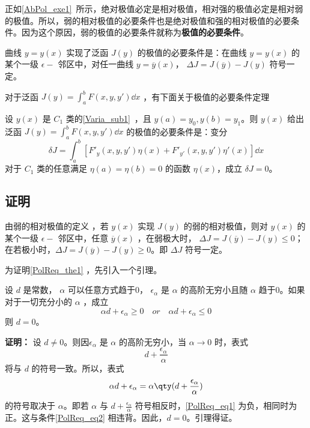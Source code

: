 

正如\autoref{AbPol_exe1}~所示，绝对极值必定是相对极值，相对强的极值必定是相对弱的极值。所以，弱的相对极值的必要条件也是绝对极值和强的相对极值的必要条件。因为这个原因，弱的极值的必要条件就称为\textbf{极值的必要条件}。

曲线 $y=y(x)$ 实现了泛函 $J(y)$ 的极值的必要条件是：在曲线 $y=y(x)$ 的某个一级 $\epsilon-$ 邻区中，对任一曲线 $y=\overline{y}(x)$， $\Delta J=J(\overline{y})-J(y)$ 符号一定。

对于泛函 $J(y)=\int_a^bF(x,y,y')\dd x$ ，有下面关于极值的必要条件定理
\begin{theorem}{}\label{PolReq_the1}
设 $y(x)$ 是 $C_1$ 类的\autoref{Varia_sub1}~，且 $y(a)=y_0,y(b)=y_1$。则 $y(x)$ 给出泛函 $J(y)=\int_a^bF(x,y,y')\dd x$ 的极值的必要条件是：变分
\begin{equation}
\delta J=\int_a^b[F'_y(x,y,y')\eta(x)+F'_{y'}(x,y,y')\eta'(x)]\dd x
\end{equation}
对于 $C_1$ 类的任意满足 $\eta(a)=\eta(b)=0$ 的函数 $\eta(x)$，成立 $\delta J=0$。
\end{theorem}
\subsection{证明}
由弱的相对极值的定义 ，若 $y(x)$ 实现 $J(y)$ 的弱的相对极值，则对 $y(x)$ 的某个一级 $\epsilon-$ 邻区中，任意 $\overline{y}(x)$ ，在弱极大时， $\Delta J=J(\overline{y})-J(y)\leq 0$；在若极小时，$\Delta J=J(\overline{y})-J(y)\geq 0$。即 $\Delta J$ 符号一定。

为证明\autoref{PolReq_the1} ，先引入一个引理。
\begin{lemma}{}\label{PolReq_lem1}
设 $d$ 是常数， $\alpha$ 可以任意方式趋于0， $\epsilon_\alpha$ 是 $\alpha$ 的高阶无穷小且随 $\alpha$ 趋于0。如果对于一切充分小的 $\alpha$ ，成立 
\begin{equation}\label{PolReq_eq2}
\alpha d+\epsilon_\alpha\geq0\quad or\quad\alpha d+\epsilon_\alpha\leq0
\end{equation}
则 $d=0$。
\end{lemma}
\textbf{证明：} 设 $d\neq 0$。则因$\epsilon_\alpha$ 是 $\alpha$ 的高阶无穷小，当 $\alpha\rightarrow0$ 时，表式
\begin{equation}
d+\frac{\epsilon_\alpha}{\alpha}
\end{equation}
 将与 $d$ 的符号一致。所以，表式
 \begin{equation}\label{PolReq_eq1}
 \alpha d+\epsilon_\alpha=\alpha\qty(d+\frac{\epsilon_\alpha}{\alpha})
 \end{equation}
 的符号取决于 $\alpha$。即若 $\alpha$ 与 $d+\frac{\epsilon_\alpha}{\alpha}$ 符号相反时，\autoref{PolReq_eq1} 为负，相同时为正。这与条件\autoref{PolReq_eq2} 相违背。因此，$d=0$。引理得证。
